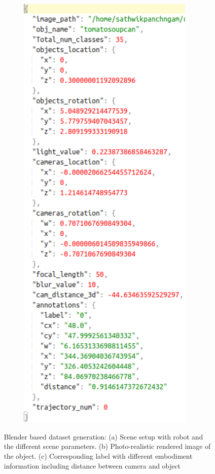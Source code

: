 \begin{figure}[t]
\begin{subfigure}[b]{0.35\linewidth}
\includegraphics[width=0.95\textwidth]{images/dataset_label.png}
 \caption{}\label{fig:labelblender}
  \end{subfigure}   

\caption{Blender based dataset generation: (a) Scene setup with robot and the different scene parameters. (b) Photo-realistic rendered image of the object. (c) Corresponding label with different embodiment information including distance between camera and object}\label{fig:Blender}
\end{figure}

